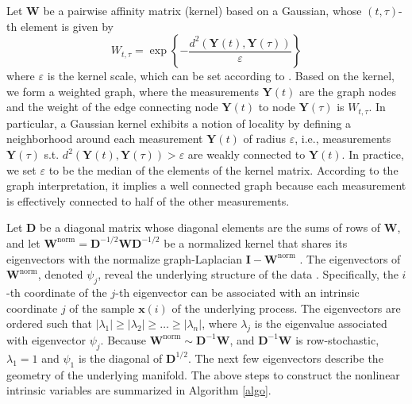 \documentclass[aip,jcp,preprint]{revtex4-1}
\begin{document}
Let $\mathbf{W}$ be a pairwise affinity matrix (kernel) based on a Gaussian, whose $(t,\tau)$-th element is given by
\begin{equation}
	W_{t,\tau} = \exp \left\{ - \frac{ d^2(\mathbf{Y}(t), \mathbf{Y}(\tau) )} {\varepsilon}\right\}
	\label{eq:kernel}
\end{equation}
where $\varepsilon$ is the kernel scale, which can be set according to .
%
Based on the kernel, we form a weighted graph, where the measurements $\mathbf{Y}(t)$ are the graph nodes and the weight of the edge connecting node $\mathbf{Y}(t)$ to node $\mathbf{Y}(\tau)$ is $W_{t,\tau}$. 
%
In particular, a Gaussian kernel exhibits a notion of locality by defining a neighborhood around each measurement $\mathbf{Y}(t)$ of radius $\varepsilon$, 
i.e., measurements $\mathbf{Y}(\tau)$ s.t. $d^2(\mathbf{Y}(t), \mathbf{Y}(\tau) ) > \varepsilon$ are weakly connected to $\mathbf{Y}(t)$. 
%
In practice, we set $\varepsilon$ to be the median of the elements of the kernel matrix. 
%
According to the graph interpretation, it implies a well connected graph because each measurement is effectively connected to half of the other measurements.

Let $\mathbf{D}$ be a diagonal matrix whose diagonal elements are the sums of rows of $\mathbf{W}$, and let $\mathbf{W}^{\mathrm{norm}} = \mathbf{D}^{-1/2}\mathbf{W}\mathbf{D}^{-1/2}$
be a normalized kernel that shares its eigenvectors with the normalize graph-Laplacian $\mathbf{I}-\mathbf{W}^{\mathrm{norm}}$ \cite{chung1997spectral}.
%
The eigenvectors of $\mathbf{W}^{\mathrm{norm}}$, denoted $\psi_j$, reveal the underlying structure of the data \cite{coifman2005geometric}.
%
Specifically, the $i$-th coordinate of the $j$-th eigenvector can be associated with an intrinsic coordinate $j$ of the sample $\mathbf{x}(i)$ of the underlying process.
%
The eigenvectors are ordered such that $|\lambda_1| \ge |\lambda_2| \ge \dots \ge |\lambda_n|$, where $\lambda_j$ is the eigenvalue associated with eigenvector $\psi_j$. 
%
Because $\mathbf{W}^{\mathrm{norm}} \sim \mathbf{D}^{-1}\mathbf{W} $, and $\mathbf{D}^{-1}\mathbf{W}$ is row-stochastic, 
$\lambda_1 = 1$ and $\psi_1$ is the diagonal of $\mathbf{D}^{1/2}$. 
%
The next few eigenvectors describe the geometry of the underlying manifold.
%
The above steps to construct the nonlinear intrinsic variables are summarized in Algorithm \ref{algo}.
\end{document}
